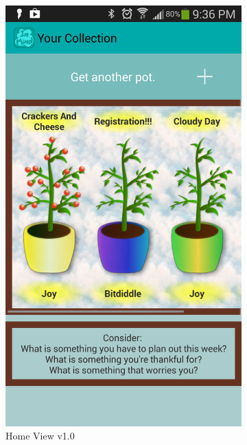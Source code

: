   \begin{figure}
    \caption{\textbf{Evolution of InMind Look and Feel Home View} --
    On feedback from users, the interface evolved to be more intuitive and attractive.}
    \centering
    \begin{subfigure}[b]{0.4\textwidth}
      \includegraphics[width=\textwidth]{planter_init.png}
      \caption{Home View v1.0}
    \end{subfigure}
    \begin{subfigure}[b]{0.4\textwidth}

\end{subfigure}
\end{figure}
